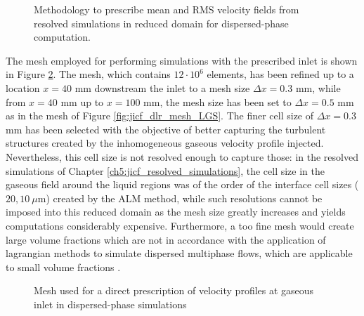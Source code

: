 \begin{figure}[h!]	
	\centering	{}
	\caption{Methodology to prescribe mean and RMS velocity fields from resolved simulations in reduced domain for dispersed-phase computation.}
	\label{fig:custom_inlet_methodology}
\end{figure}

The mesh employed for performing simulations with the prescribed inlet is shown in Figure \ref{fig:mesh_reduced_inlet}. The mesh, which contains $12 \cdot 10^6$ elements, has been refined up to a location $x = 40$ mm downstream the inlet to a mesh size $\Delta x = 0.3$ mm, while from $x = 40$ mm up to $x = 100$ mm, the mesh size has been set to $\Delta x = 0.5$ mm as in the mesh of Figure \ref{fig:jicf_dlr_mesh_LGS}. The finer cell size of $\Delta x = 0.3$ mm has been selected  with the objective of better capturing the turbulent structures created by the inhomogeneous gaseous velocity profile injected. Nevertheless, this cell size is not resolved enough to capture those: in the resolved simulations of Chapter \ref{ch5:jicf_resolved_simulations}, the cell size in the gaseous field around the liquid regions was of the order of the interface cell sizes ($20, 10~\mu$m) created by the ALM method, while such resolutions cannot be imposed into this reduced domain as the mesh size greatly increases and yields computations considerably expensive. Furthermore, a too fine mesh would create large volume fractions which are not in accordance with the application of lagrangian methods to simulate dispersed multiphase flows, which are applicable to small volume fractions .

\clearpage

\begin{figure}[h!]	
	\centering	
	\caption{Mesh used for a direct prescription of velocity profiles at gaseous inlet in dispersed-phase simulations}
	\label{fig:mesh_reduced_inlet}
\end{figure}




